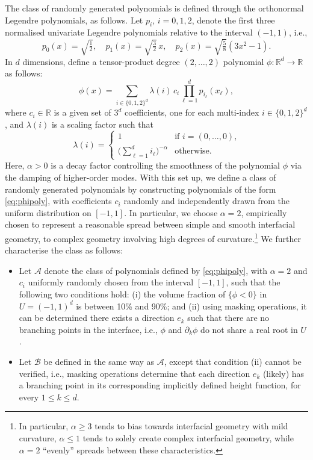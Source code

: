 \documentclass[onefignum,onetabnum,onealgnum,oneeqnum]{siamart190516}
\newcommand{\R}{\mathbb R}
\begin{document}
The class of randomly generated polynomials is defined through the orthonormal Legendre polynomials, as follows. Let $p_i$, $i = 0, 1, 2$, denote the first three normalised univariate Legendre polynomials relative to the interval $(-1,1)$, i.e.,
\[ p_0(x) = \sqrt{\tfrac12}, \quad p_1(x) = \sqrt{\tfrac32}\, x, \quad p_2(x) = \sqrt{\tfrac58}  (3x^2 - 1). \]
In $d$ dimensions, define a tensor-product degree $(2,\ldots,2)$ polynomial $\phi: \R^d \to \R$ as follows:
\begin{equation} \label{eq:phipoly} \phi(x) = \sum_{i \in \{0,1,2\}^d} \lambda(i)\, c_i \prod_{\ell=1}^d p_{i_\ell} (x_\ell), \end{equation}
where $c_i \in \R$ is a given set of $3^d$ coefficients, one for each multi-index $i \in \{0,1,2\}^d$, and $\lambda(i)$ is a scaling factor such that
\[ \lambda(i) = \begin{cases} 1 & \text{if $i = (0,\ldots,0)$,} \\ \bigl(\sum_{\ell = 1}^d i_\ell \bigr)^{-\alpha} & \text{otherwise.} \end{cases} \]
Here, $\alpha > 0$ is a decay factor controlling the smoothness of the polynomial $\phi$ via the damping of higher-order modes. With this set up, we define a class of randomly generated polynomials by constructing polynomials of the form \eqref{eq:phipoly}, with coefficients $c_i$ randomly and independently drawn from the uniform distribution on $[-1,1]$. In particular, we choose $\alpha = 2$, empirically chosen to represent a reasonable spread between simple and smooth interfacial geometry, to complex geometry involving high degrees of curvature.\footnote{In particular, $\alpha \geq 3$ tends to bias towards interfacial geometry with mild curvature, $\alpha \leq 1$ tends to solely create complex interfacial geometry, while $\alpha = 2$ ``evenly'' spreads between these characteristics.} We further characterise the class as follows:
\begin{itemize}
\item Let ${\mathcal A}$ denote the class of polynomials defined by \eqref{eq:phipoly}, with $\alpha = 2$ and $c_i$ uniformly randomly chosen from the interval $[-1,1]$, such that the following two conditions hold: (i) the volume fraction of $\{\phi < 0\}$ in $U = (-1,1)^d$ is between 10\% and 90\%; and (ii) using masking operations, it can be determined there exists a direction $e_k$ such that there are no branching points in the interface, i.e., $\phi$ and $\partial_k \phi$ do not share a real root in $U$.
\item Let ${\mathcal B}$ be defined in the same way as ${\mathcal A}$, except that condition (ii) cannot be verified, i.e., masking operations determine that each direction $e_k$ (likely) has a branching point in its corresponding implicitly defined height function, for every $1 \leq k \leq d$.
\end{itemize}
\end{document}
